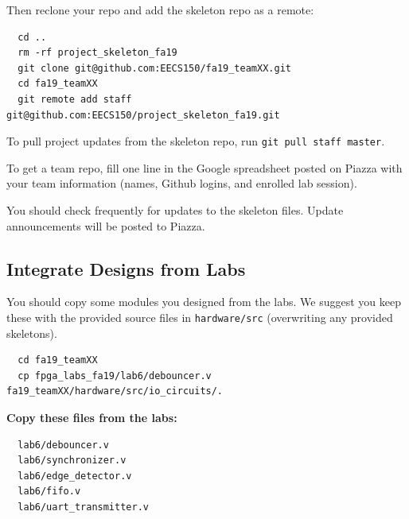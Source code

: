 \documentclass[11pt]{article}
\begin{document}
Then reclone your repo and add the skeleton repo as a remote:
\begin{verbatim}
  cd ..
  rm -rf project_skeleton_fa19
  git clone git@github.com:EECS150/fa19_teamXX.git
  cd fa19_teamXX
  git remote add staff git@github.com:EECS150/project_skeleton_fa19.git
\end{verbatim}

To pull project updates from the skeleton repo, run \verb|git pull staff master|.

To get a team repo, fill one line in the Google spreadsheet posted on Piazza with your team information (names, Github logins, and enrolled lab session).

You should check frequently for updates to the skeleton files.
Update announcements will be posted to Piazza.

\subsection{Integrate Designs from Labs} \label{past_designs}
You should copy some modules you designed from the labs.
We suggest you keep these with the provided source files in \verb|hardware/src| (overwriting any provided skeletons).

\begin{verbatim}
  cd fa19_teamXX
  cp fpga_labs_fa19/lab6/debouncer.v fa19_teamXX/hardware/src/io_circuits/.
\end{verbatim}

\textbf{Copy these files from the labs:}
\begin{verbatim}
  lab6/debouncer.v
  lab6/synchronizer.v
  lab6/edge_detector.v
  lab6/fifo.v
  lab6/uart_transmitter.v
\end{verbatim}
\end{document}
